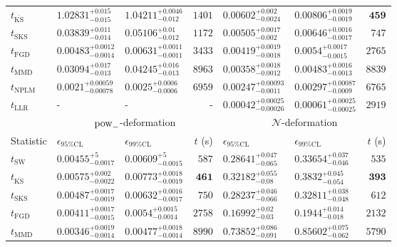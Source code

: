 \begin{tabular}{l|llr|llr}
	$t_{\overline{\mathrm{KS}}}$ & $1.02831_{-0.015}^{+0.015}$ & $1.04211_{-0.012}^{+0.0046}$ & $1401$ & $0.00602_{-0.0024}^{+0.002}$ & $0.00806_{-0.0019}^{+0.0019}$ & ${\mathbf{459}}$ \\
	$t_{\mathrm{SKS}}$ & $0.03839_{-0.014}^{+0.011}$ & $0.05106_{-0.012}^{+0.01}$ & $1172$ & $0.00505_{-0.002}^{+0.0017}$ & $0.00646_{-0.0017}^{+0.0016}$ & $747$ \\
	$t_{\mathrm{FGD}}$ & ${\mathbf{0.00483_{-0.0014}^{+0.0012}}}$ & ${\mathbf{0.00631_{-0.0011}^{+0.0011}}}$ & $3433$ & $0.00419_{-0.0018}^{+0.0019}$ & $0.0054_{-0.0015}^{+0.0017}$ & $2765$ \\
	$t_{\mathrm{MMD}}$ & $0.03094_{-0.013}^{+0.017}$ & $0.04245_{-0.013}^{+0.016}$ & $8963$ & ${\mathbf{0.00358_{-0.0012}^{+0.0018}}}$ & ${\mathbf{0.00483_{-0.0013}^{+0.0016}}}$ & $8839$ \\
\rowcolor{red!35}	$t_{\mathrm{NPLM}}$ & $0.0021_{-0.00078}^{+0.00059}$ & $0.0025_{-0.0006}^{+0.0006}$ & $6959$ & $0.00247_{-0.0011}^{+0.00093}$ & $0.00297_{-0.0009}^{+0.00087}$ & $6765$ \\
	$t_{\mathrm{LLR}}$ & - & - & - & $0.00042_{-0.00026}^{+0.00025}$ & $0.00061_{-0.00025}^{+0.00025}$ & $2919$ \\
	\toprule
	\multicolumn{1}{c}{} & \multicolumn{3}{c}{$\rm{pow}_{-}$-deformation} & \multicolumn{3}{c}{$\mathcal{N}$-deformation} \\
	Statistic & $\epsilon_{95\%\mathrm{CL}}$ & $\epsilon_{99\%\mathrm{CL}}$ & $t$ (s) & $\epsilon_{95\%\mathrm{CL}}$ & $\epsilon_{99\%\mathrm{CL}}$ & $t$ (s) \\
	\midrule
	$t_{\mathrm{SW}}$ & $0.00455_{-0.0017}^{+5}$ & $0.00609_{-0.0015}^{+5}$ & $587$ & $0.28641_{-0.065}^{+0.047}$ & $0.33654_{-0.046}^{+0.037}$ & $535$ \\
	$t_{\overline{\mathrm{KS}}}$ & $0.00575_{-0.0022}^{+0.002}$ & $0.00773_{-0.0019}^{+0.0018}$ & ${\mathbf{461}}$ & $0.32182_{-0.08}^{+0.055}$ & $0.3832_{-0.054}^{+0.045}$ & ${\mathbf{393}}$ \\
	$t_{\mathrm{SKS}}$ & $0.00487_{-0.0019}^{+0.0017}$ & $0.00632_{-0.0017}^{+0.0016}$ & $750$ & $0.28237_{-0.066}^{+0.046}$ & $0.32811_{-0.048}^{+0.038}$ & $612$ \\
	$t_{\mathrm{FGD}}$ & $0.00411_{-0.0015}^{+0.0017}$ & $0.0054_{-0.0014}^{+0.0015}$ & $2758$ & ${\mathbf{0.16992_{-0.03}^{+0.02}}}$ & ${\mathbf{0.1944_{-0.018}^{+0.014}}}$ & $2132$ \\
	$t_{\mathrm{MMD}}$ & ${\mathbf{0.00346_{-0.0014}^{+0.0019}}}$ & ${\mathbf{0.00477_{-0.0014}^{+0.0018}}}$ & $8990$ & $0.73852_{-0.091}^{+0.086}$ & $0.85602_{-0.062}^{+0.075}$ & $5790$ \\

\end{tabular}
